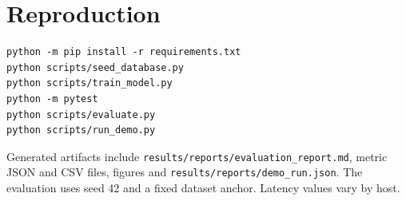\documentclass[10pt,twocolumn]{article}
\begin{document}
\appendix
\section{Reproduction}

\begin{small}
\begin{verbatim}
python -m pip install -r requirements.txt
python scripts/seed_database.py
python scripts/train_model.py
python -m pytest
python scripts/evaluate.py
python scripts/run_demo.py
\end{verbatim}
\end{small}

Generated artifacts include \texttt{results/reports/evaluation\_report.md}, metric JSON and CSV files, figures and \texttt{results/reports/demo\_run.json}. The evaluation uses seed 42 and a fixed dataset anchor. Latency values vary by host.
\end{document}
